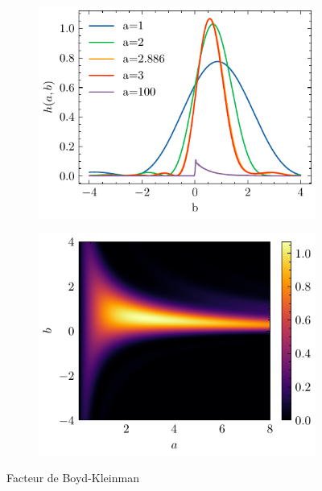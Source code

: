 \documentclass[11pt,a4paper]{article}
\begin{document}
\begin{figure}[h]
\centering
\begin{subfigure}{0.45\textwidth}
	\includegraphics[width=\textwidth]{./img/bk-factor.pdf}
\end{subfigure}
\begin{subfigure}{0.45\textwidth}
	\includegraphics[width=\textwidth]{./img/bk-factor-cmap.pdf}
\end{subfigure}
\caption{Facteur de Boyd-Kleinman}
\label{fig:bk-factor}
\end{figure}
\end{document}
